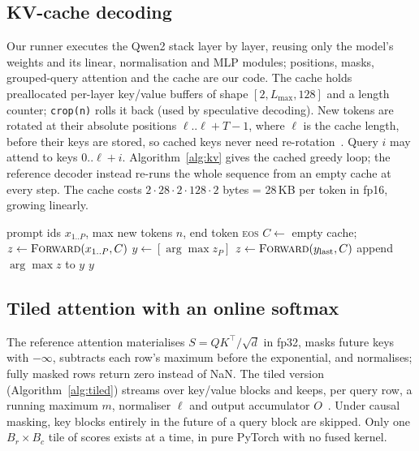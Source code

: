 \documentclass[conference]{IEEEtran}
\newcommand{\code}[1]{\texttt{\small #1}}
\begin{document}
\subsection{KV-cache decoding}
Our runner executes the Qwen2 stack layer by layer, reusing only the model's weights and its linear, normalisation and MLP modules; positions, masks, grouped-query attention and the cache are our code. The cache holds preallocated per-layer key/value buffers of shape $[2, L_{\max}, 128]$ and a length counter; \code{crop(n)} rolls it back (used by speculative decoding). New tokens are rotated at their absolute positions $\ell..\ell{+}T{-}1$, where $\ell$ is the cache length, before their keys are stored, so cached keys never need re-rotation~\cite{su2021roformer}. Query $i$ may attend to keys $0..\ell{+}i$. Algorithm~\ref{alg:kv} gives the cached greedy loop; the reference decoder instead re-runs the whole sequence from an empty cache at every step. The cache costs $2\cdot28\cdot2\cdot128\cdot2$ bytes = 28\,KB per token in fp16, growing linearly.

\begin{algorithm}[t]
\caption{Cache-aware greedy decoding}\label{alg:kv}
\small
\begin{algorithmic}[1]
\Require prompt ids $x_{1..P}$, max new tokens $n$, end token \textsc{eos}
\State $C \gets$ empty cache; $z \gets \textsc{Forward}(x_{1..P}, C)$ 
\State $y \gets [\arg\max z_P]$
  \State $z \gets \textsc{Forward}(y_{\text{last}}, C)$ 
  \State append $\arg\max z$ to $y$ 
\EndWhile
\State \Return $y$
\end{algorithmic}
\end{algorithm}

\subsection{Tiled attention with an online softmax}
The reference attention materialises $S = QK^\top/\sqrt{d}$ in fp32, masks future keys with $-\infty$, subtracts each row's maximum before the exponential, and normalises; fully masked rows return zero instead of NaN. The tiled version (Algorithm~\ref{alg:tiled}) streams over key/value blocks and keeps, per query row, a running maximum $m$, normaliser $\ell$ and output accumulator $O$~\cite{milakov2018online,dao2022flash}. Under causal masking, key blocks entirely in the future of a query block are skipped. Only one $B_r\times B_c$ tile of scores exists at a time, in pure PyTorch with no fused kernel.
\end{document}
